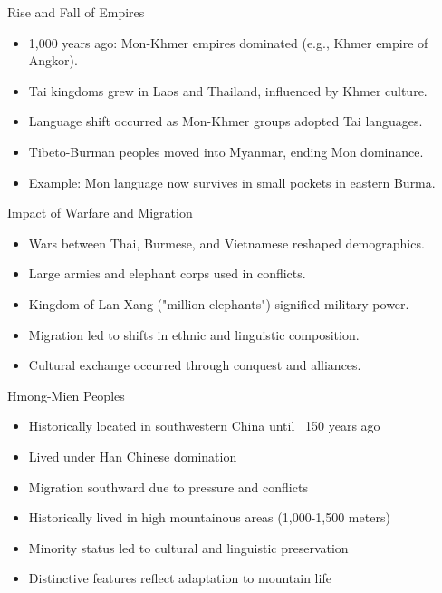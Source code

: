 \documentclass{beamer}
\begin{document}
\begin{frame}{Rise and Fall of Empires}
    \begin{itemize}
        \item 1,000 years ago: Mon-Khmer empires dominated (e.g., Khmer empire of Angkor).
        \item Tai kingdoms grew in Laos and Thailand, influenced by Khmer culture.
        \item Language shift occurred as Mon-Khmer groups adopted Tai languages.
        \item Tibeto-Burman peoples moved into Myanmar, ending Mon dominance.
        \item Example: Mon language now survives in small pockets in eastern Burma.
    \end{itemize}
\end{frame}

\begin{frame}{Impact of Warfare and Migration}
    \begin{itemize}
        \item Wars between Thai, Burmese, and Vietnamese reshaped demographics.
        \item Large armies and elephant corps used in conflicts.
        \item Kingdom of Lan Xang ("million elephants") signified military power.
        \item Migration led to shifts in ethnic and linguistic composition.
        \item Cultural exchange occurred through conquest and alliances.
    \end{itemize}
\end{frame}

\begin{frame}{Hmong-Mien Peoples}
    \begin{itemize}
        \item Historically located in southwestern China until ~150 years ago
        \item Lived under Han Chinese domination
        \item Migration southward due to pressure and conflicts
        \item Historically lived in high mountainous areas (1,000-1,500 meters)
        \item Minority status led to cultural and linguistic preservation
        \item Distinctive features reflect adaptation to mountain life
     \end{itemize}
\end{frame}
\end{document}
